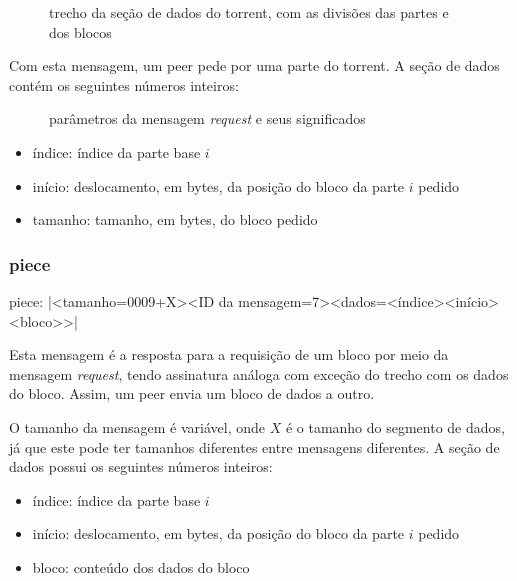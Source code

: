 \begin{figure}[H]
    \centering
    \caption{trecho da seção de dados do torrent, com as divisões das partes e dos
    blocos}
    \label{fig:partes}
\end{figure}

Com esta mensagem, um \gls*{peer} pede por uma parte do \gls*{torrent}. A seção de dados
contém os seguintes números inteiros:

\begin{figure}[ht!]
    \centering
    \caption{parâmetros da mensagem \emph{request} e seus significados}
    \label{fig:request}
\end{figure}

\begin{itemize}
    \item índice: índice da parte base $i$
    \item início: deslocamento, em bytes, da posição do bloco da parte $i$ pedido
    \item tamanho: tamanho, em bytes, do bloco pedido
\end{itemize}


\subsubsection*{piece}

piece: \bverb|<tamanho=0009+X><ID da mensagem=7><dados=<índice><início><bloco>>|

Esta mensagem é a resposta para a requisição de um bloco por meio da mensagem
\emph{request}, tendo assinatura análoga com exceção do trecho com os dados do bloco.
Assim, um \gls*{peer} envia um bloco de dados a outro.

\newpage
O tamanho da mensagem é variável, onde $X$ é o tamanho do segmento de dados, já que
este pode ter tamanhos diferentes entre mensagens diferentes. A seção de dados possui
os seguintes números inteiros:

\begin{itemize}
    \item índice: índice da parte base $i$
    \item início: deslocamento, em bytes, da posição do bloco da parte $i$ pedido
    \item bloco: conteúdo dos dados do bloco
\end{itemize}

